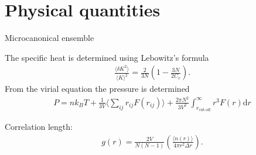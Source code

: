 \section{Physical quantities}
Microcanonical ensemble

The specific heat is determined using Lebowitz's formula \cite{jos}
\begin{gather*}
    \frac{\langle \delta K^2\rangle}{\langle K\rangle^2}=\frac{2}{3N}\left( 1-\frac{3N}{2C_v}\right).
\end{gather*}
From the virial equation the pressure is determined 
\begin{gather*}
    P = nk_BT + \frac{1}{3V}\Big \langle \sum_{ij} r_{ij}F(r_{ij})\Big \rangle + \frac{2\pi N^2}{3V^2}\int_{r_{\text{cut-off}}}^{\infty}r^3 F(r) \text{d}r
\end{gather*}

Correlation length:
\begin{gather*}
    g(r)=\frac{2V}{N(N-1)}\left(\frac{\langle n(r)\rangle}{4\pi r^2\Delta r}\right).
\end{gather*}